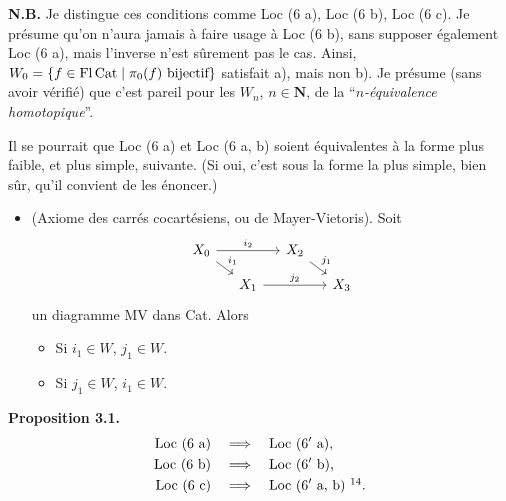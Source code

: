 \textbf{N.B.} Je distingue ces conditions comme Loc (6 a), Loc (6 b), Loc (6 c). Je présume qu'on n'aura jamais à faire usage à Loc (6 b), sans supposer également Loc (6 a), mais l'inverse n'est sûrement pas le cas. Ainsi, $W_0=\{f\in\operatorname{Fl}\mathrm{Cat}\mid\pi_0(f)\text{ bijectif}\}$ satisfait a), mais non b). Je présume (sans avoir vérifié) que c'est pareil pour les $W_n$, $n\in\mathbf{N}$, de la “\textit{$n$-équivalence homotopique}”.

Il se pourrait que Loc (6 a) et Loc (6 a, b) soient équivalentes à la forme plus faible, et plus simple, suivante. (Si oui, c'est sous la forme la plus simple, bien sûr, qu'il convient de les énoncer.)

\begin{itemize}[leftmargin=5em,labelwidth=4em,align=left]
\item[\textbf{Loc 6$'$}] (Axiome des carrés cocartésiens, ou de Mayer-Vietoris). Soit
\[
\begin{tikzcd}[row sep=small,column sep=small]
X_0 \arrow[rr,"i_2"] \arrow[dr,"i_1"] & & X_2 \arrow[dr,"j_1"] & \\
& X_1 \arrow[rr,"j_2"] & & X_3
\end{tikzcd}
\]
un diagramme MV dans Cat. Alors
\begin{itemize}[leftmargin=3em,labelwidth=2.5em,align=right]
\item[a)] Si $i_1\in W$, $j_1\in W$.
\item[b)] Si $j_1\in W$, $i_1\in W$.
\end{itemize}
\end{itemize}

\textbf{Proposition 3.1.}
\[
\begin{aligned}
\text{Loc (6 a)}\quad &\Longrightarrow\quad \text{Loc (6$'$ a),}\\
\text{Loc (6 b)}\quad &\Longrightarrow\quad \text{Loc (6$'$ b),}\\
\text{Loc (6 c)}\quad &\Longrightarrow\quad \text{Loc (6$'$ a, b)}\ \footnotemark[14].
\end{aligned}
\]

